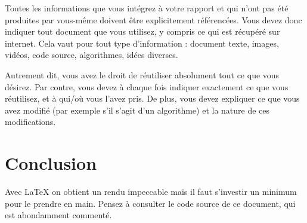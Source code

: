 \documentclass{ceri}
\begin{document}
Toutes les informations que vous intégrez à votre rapport et qui n'ont pas été produites par vous-même doivent être explicitement référencées. Vous devez donc indiquer tout document que vous utilisez, y compris ce qui est récupéré sur internet. Cela vaut pour tout type d'information : document texte, images, vidéos, code source, algorithmes, idées diverses.

Autrement dit, vous avez le droit de réutiliser absolument tout ce que vous désirez. Par contre, vous devez à chaque fois indiquer exactement ce que vous réutilisez, et à qui/où vous l'avez pris. De plus, vous devez expliquer ce que vous avez modifié (par exemple s'il s'agit d'un algorithme) et la nature de ces modifications.



  
\section{Conclusion}
Avec \LaTeX{} on obtient un rendu impeccable mais il faut s'investir un minimum pour le prendre en main. Pensez à consulter le code source de ce document, qui est abondamment commenté.
 
 
  
  
\end{document}
